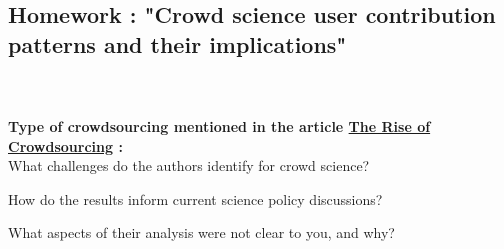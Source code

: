 \documentclass[14pt]
{article}
\begin{document}
\pagestyle{fancy}

\bigskip
\begin{center}
	\section*{\textbf{{\LARGE Homework : "Crowd science user contribution patterns and their implications"}}}
\end{center}
\bigskip\bigskip\bigskip
\paragraph*{\\}\textbf{Type of crowdsourcing mentioned in the article \href{https://www.wired.com/2006/06/crowds/}{The Rise of Crowdsourcing} :}\\
What challenges do the authors identify for crowd science?


How do the results inform current science policy discussions?


What aspects of their analysis were not clear to you, and why?
\end{document}
